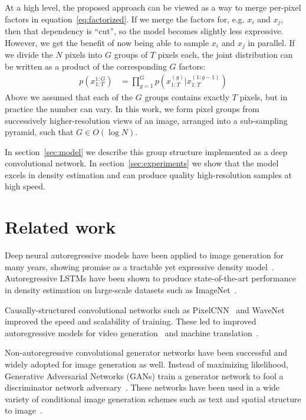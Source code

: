 \documentclass{article}
\begin{document}
At a high level, the proposed approach can be viewed as a way to merge per-pixel factors in equation~\ref{eq:factorized}.
If we merge the factors for, e.g. $x_i$ and $x_j$, then that dependency is ``cut'', so the model becomes slightly less expressive.
However, we get the benefit of now being able to sample $x_i$ and $x_j$ in parallel.
If we divide the $N$ pixels into $G$ groups of $T$ pixels each, the joint distribution can be written as a product of the corresponding $G$ factors:
\begin{align}
\label{eq:factorized2}
p(x^{1:G}_{1:T}) &= \prod_{g=1}^{G}p(x^{(g)}_{1:T} | x^{(1:g-1)}_{1:T})
\end{align}
Above we assumed that each of the $G$ groups contains exactly $T$ pixels, but in practice the number can vary.
In this work, we form pixel groups from successively higher-resolution views of an image, arranged into a sub-sampling pyramid, such that $G \in O(\log N)$.

In section~\ref{sec:model} we describe this group structure implemented as a deep convolutional network.
In section~\ref{sec:experiments} we show that the model excels in density estimation and can produce quality high-resolution samples at high speed.
\section{Related work}
\label{sec:related}
Deep neural autoregressive models have been applied to image generation for many years, showing promise as a tractable yet expressive density model~\citep{larochelle2011neural,uria2013rnade}.
Autoregressive LSTMs have been shown to produce state-of-the-art performance in density estimation on large-scale  datasets such as ImageNet~\cite{Theis2015c,Oord2016pixelRNN}.


Causally-structured convolutional networks such as PixelCNN~\citep{oord2016conditional}
and WaveNet~\citep{oord2016wavenet} improved the speed and scalability of training.
These led to improved autoregressive models for video generation~\citep{kalchbrenner2016video} and machine translation~\citep{kalchbrenner2016neural}.

Non-autoregressive convolutional generator networks have been successful and widely adopted for image generation as well.
Instead of maximizing likelihood, Generative Adversarial Networks (GANs) train a generator network to fool a discriminator network adversary~\cite{GoodfellowPMXWOCB14}.
These networks have been used in a wide variety of conditional image generation schemes such as text and spatial structure to image~\cite{mansimov2015generating,reed2016generative,reed2016learning,wang2016generative}.
\end{document}
